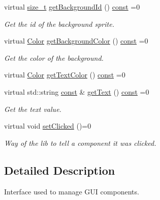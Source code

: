 \begin{DoxyCompactItemize}
virtual \hyperlink{nc__alloc_8h_a7b60c5629e55e8ec87a4547dd4abced4}{size\-\_\-t} \hyperlink{classarcade_1_1_i_component_a7d4c00172b0ba0e3dc63832a9234efbb}{get\-Background\-Id} () \hyperlink{term__entry_8h_a57bd63ce7f9a353488880e3de6692d5a}{const} =0
\begin{DoxyCompactList}\small\item\em Get the id of the background sprite. \end{DoxyCompactList}\item 
virtual \hyperlink{unionarcade_1_1_color}{Color} \hyperlink{classarcade_1_1_i_component_a99301c61be2a21ef8a274727ba781a00}{get\-Background\-Color} () \hyperlink{term__entry_8h_a57bd63ce7f9a353488880e3de6692d5a}{const} =0
\begin{DoxyCompactList}\small\item\em Get the color of the background. \end{DoxyCompactList}\item 
virtual \hyperlink{unionarcade_1_1_color}{Color} \hyperlink{classarcade_1_1_i_component_a9d4c57ad7c49e39ef0269f10fdc14807}{get\-Text\-Color} () \hyperlink{term__entry_8h_a57bd63ce7f9a353488880e3de6692d5a}{const} =0
\item 
virtual std\-::string \hyperlink{term__entry_8h_a57bd63ce7f9a353488880e3de6692d5a}{const} \& \hyperlink{classarcade_1_1_i_component_a85e1e58ad9109683522f25d62a49257a}{get\-Text} () \hyperlink{term__entry_8h_a57bd63ce7f9a353488880e3de6692d5a}{const} =0
\begin{DoxyCompactList}\small\item\em Get the text value. \end{DoxyCompactList}\item 
virtual void \hyperlink{classarcade_1_1_i_component_ae0cd9b58ad0b127c671a5d8f92d9c25f}{set\-Clicked} ()=0
\begin{DoxyCompactList}\small\item\em Way of the lib to tell a component it was clicked. \end{DoxyCompactList}\end{DoxyCompactItemize}


\subsection{Detailed Description}
Interface used to manage G\-U\-I components. 

